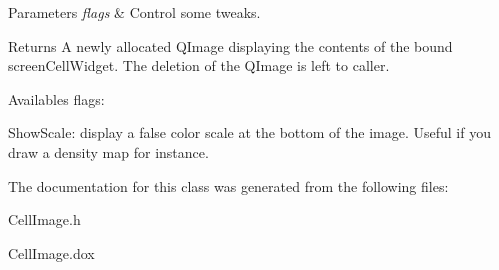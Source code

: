 \begin{DoxyParams}{Parameters}
{\em flags} & Control some tweaks.\\
\hline
\end{DoxyParams}
\begin{DoxyReturn}{Returns}
A newly allocated Q\+Image displaying the contents of the bound {\ttfamily screen\+Cell\+Widget}. The deletion of the Q\+Image is left to caller.
\end{DoxyReturn}
Availables flags\+: 
\begin{DoxyItemize}
\item Show\+Scale\+: display a false color scale at the bottom of the image. Useful if you draw a density map for instance. 
\end{DoxyItemize}

The documentation for this class was generated from the following files\+:\begin{DoxyCompactItemize}
\item 
Cell\+Image.\+h\item 
Cell\+Image.\+dox\end{DoxyCompactItemize}
